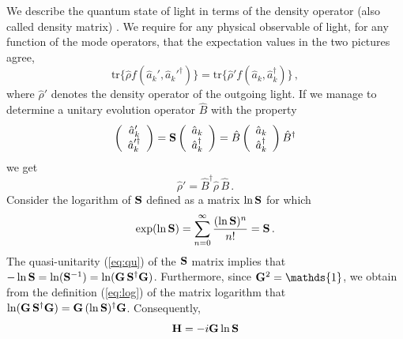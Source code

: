 \documentclass[12pt,amsmath,amssymb]{article}
\def\underline#1{{\bf #1}}
\numberwithin{equation}{section}
\begin{document}
We describe the quantum state of light in terms of the density operator
(also called density matrix) \cite{Carmichael,Gardiner,LL5,Leonhardt}.
We require for any physical observable of light, for any
function of the mode operators, that the expectation values in
the two pictures agree,
\begin{equation}
\mathrm{tr}\{\hat{\rho}f(\hat{a}_k',\hat{a}_k'^\dagger)\} =
\mathrm{tr}\{\hat{\rho}'f(\hat{a}_k,\hat{a}_k^\dagger)\}
\,,
\end{equation}
where $\hat{\rho}'$ denotes the density operator of the outgoing light.
If we manage to determine a unitary evolution operator $\hat{B}$
with the property
\begin{equation}
\label{eq:bop}
\left(
    \begin{array}{c}
     \hat{a}_k'  \\
     \hat{a}_k'^\dagger
    \end{array}
\right)
=
\underline{S}
\left(
    \begin{array}{c}
     \hat{a}_k  \\
     \hat{a}_k^\dagger
    \end{array}
\right)
=
\hat{B}
\left(
    \begin{array}{c}
     \hat{a}_k  \\
     \hat{a}_k^\dagger
    \end{array}
\right)
\hat{B}^\dagger
\end{equation}
we get
\begin{equation}
\hat{\rho}' = \hat{B}^\dagger \hat{\rho}\,\hat{B}
\,.
\end{equation}
Consider the logarithm of $\underline{S}$ defined as a matrix
$\ln \underline{S}$ for which
\begin{equation}
\label{eq:log} \exp(\ln \underline{S}) = \sum_{n=0}^\infty
\frac{(\ln \underline{S})^n}{n!} = \underline{S} \,.
\end{equation}
The quasi-unitarity (\ref{eq:qu}) of the $\underline{S}$ matrix
implies that $-\ln\underline{S}=\ln(\underline{S}^{-1})=
\ln(\underline{G}\,\underline{S}^\dagger\underline{G})$.
Furthermore, since $\underline{G}^2=\mathds{1}$, we obtain from the
definition (\ref{eq:log}) of the matrix logarithm that
$\ln(\underline{G}\,\underline{S}^\dagger\underline{G})=
\underline{G}\,(\ln\underline{S})^\dagger\underline{G}$.
Consequently,
\begin{equation}
\label{eq:pdef} \underline{H} = -i\underline{G}\ln\underline{S}
\end{equation}
\end{document}
